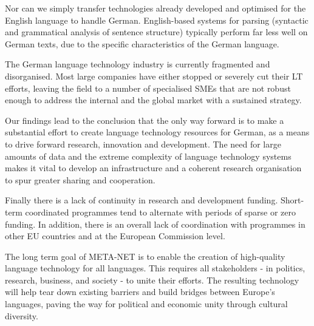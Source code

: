 \documentclass[]{../../metanetpaper}
\begin{document}
\begin{multicols}{2}
Nor can we simply transfer technologies already developed and optimised for the English language to handle German. English-based systems for parsing (syntactic and grammatical analysis of sentence structure) typically perform far less well on German texts, due to the specific characteristics of the German language.

The German language technology industry is currently fragmented and disorganised. Most large companies have either stopped or severely cut their LT efforts, leaving the field to a number of specialised SMEs that are not robust enough to address the internal and the global market with a sustained strategy. 

Our findings lead to the conclusion that the only way forward is to make a substantial effort to create language technology resources for German, as a means to drive forward research, innovation and development. The need for large amounts of data and the extreme complexity of language technology systems makes it vital to develop an infrastructure and a coherent research organisation to spur greater sharing and cooperation.

Finally there is a lack of continuity in research and development funding. Short-term coordinated programmes tend to alternate with periods of sparse or zero funding. In addition, there is an overall lack of coordination with programmes in other EU countries and at the European Commission level.

The long term goal of META-NET is to enable the creation of high-quality language technology for all languages. This requires all stakeholders - in politics, research, business, and society - to unite their efforts. The resulting technology will help tear down existing barriers and build bridges between Europe’s languages, paving the way for political and economic unity through cultural diversity. 
\end{multicols}

\clearpage

\end{document}
